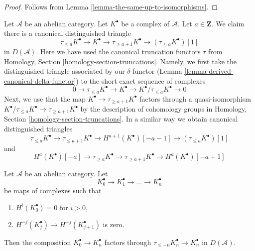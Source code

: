 \begin{proof}
Follows from
Lemma \ref{lemma-the-same-up-to-isomorphisms}.
\end{proof}

\begin{remark}
\label{remark-truncation-distinguished-triangle}
Let $\mathcal{A}$ be an abelian category. Let $K^\bullet$ be a complex
of $\mathcal{A}$. Let $a \in \mathbf{Z}$. We claim there is a canonical
distinguished triangle
$$
\tau_{\leq a}K^\bullet \to K^\bullet \to \tau_{\geq a + 1}K^\bullet \to
(\tau_{\leq a}K^\bullet)[1]
$$
in $D(\mathcal{A})$. Here we have used the canonical truncation functors $\tau$
from Homology, Section \ref{homology-section-truncations}.
Namely, we first take the distinguished
triangle associated by our $\delta$-functor
(Lemma \ref{lemma-derived-canonical-delta-functor})
to the short exact sequence of complexes
$$
0 \to \tau_{\leq a}K^\bullet \to K^\bullet \to
K^\bullet/\tau_{\leq a}K^\bullet \to 0
$$
Next, we use that the map $K^\bullet \to \tau_{\geq a + 1}K^\bullet$
factors through a quasi-isomorphism
$K^\bullet/\tau_{\leq a}K^\bullet \to \tau_{\geq a + 1}K^\bullet$
by the description of cohomology groups in
Homology, Section \ref{homology-section-truncations}.
In a similar way we obtain canonical distinguished triangles
$$
\tau_{\leq a}K^\bullet \to \tau_{\leq a + 1}K^\bullet \to
H^{a + 1}(K^\bullet)[-a-1] \to (\tau_{\leq a}K^\bullet)[1]
$$
and
$$
H^a(K^\bullet)[-a] \to \tau_{\geq a}K^\bullet \to \tau_{\geq a + 1}K^\bullet
\to H^a(K^\bullet)[-a + 1]
$$
\end{remark}

\begin{lemma}
\label{lemma-trick-vanishing-composition}
Let $\mathcal{A}$ be an abelian category. Let
$$
K_0^\bullet \to K_1^\bullet \to \ldots \to K_n^\bullet
$$
be maps of complexes such that
\begin{enumerate}
\item $H^i(K_0^\bullet) = 0$ for $i > 0$,
\item $H^{-j}(K_j^\bullet) \to H^{-j}(K_{j + 1}^\bullet)$ is zero.
\end{enumerate}
Then the composition $K_0^\bullet \to K_n^\bullet$ factors through
$\tau_{\leq -n}K_n^\bullet \to K_n^\bullet$ in $D(\mathcal{A})$.
\end{lemma}

